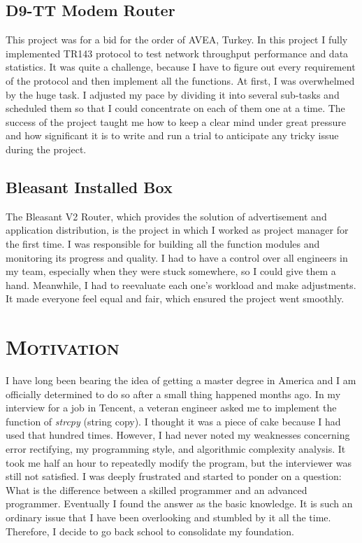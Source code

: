 \documentclass{article}
\begin{document}
\begin{multicols}{2}
		\subsection{D9-TT Modem Router}
		This project was for a bid for the order of AVEA, Turkey. In this project I fully implemented TR143 protocol to test network throughput performance and data statistics. It was quite a challenge, because I have to figure out every requirement of the protocol and then implement all the functions. At first, I was overwhelmed by the huge task. I adjusted my pace by dividing it into several sub-tasks and scheduled them so that I could concentrate on each of them one at a time. The success of the project taught me how to keep a clear mind under great pressure and how significant it is to write and run a trial to anticipate any tricky issue during the project.
		\subsection{Bleasant Installed Box}
		The Bleasant V2 Router, which provides the solution of advertisement and application distribution, is the project in which I worked as project manager for the first time. I was responsible for building all the function modules and monitoring its progress and quality. I had to have a control over all engineers in my team, especially when they were stuck somewhere, so I could give them a hand. Meanwhile, I had to reevaluate each one’s workload and make adjustments. It made everyone feel equal and fair, which ensured the project went smoothly.
		\section{\textsc{Motivation}}
		I have long been bearing the idea of getting a master degree in America and I am officially determined to do so after a small thing happened months ago. In my interview for a job in Tencent, a veteran engineer asked me to implement the function of \textit{strcpy} (string copy). I thought it was a piece of cake because I had used that hundred times. However, I had never noted my weaknesses concerning error rectifying, my programming style, and algorithmic complexity analysis. It took me half an hour to repeatedly modify the program, but the interviewer was still not satisfied. I was deeply frustrated and started to ponder on a question: What is the difference between a skilled programmer and an advanced programmer. Eventually I found the answer as the basic knowledge. It is such an ordinary issue that I have been overlooking and stumbled by it all the time. Therefore, I decide to go back  school to consolidate my foundation.

\end{multicols}
\end{document}
